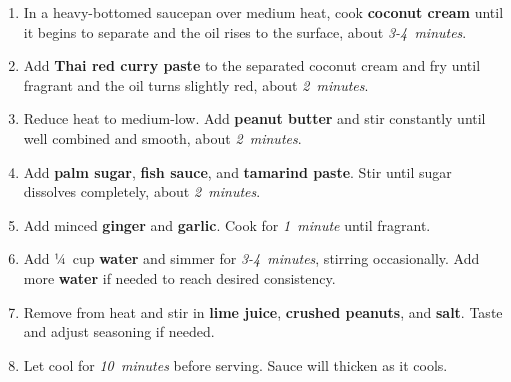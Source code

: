 \documentclass[11pt,letterpaper]{article}
\begin{document}
\begin{enumerate}
    \item In a heavy-bottomed saucepan over medium heat, cook \textbf{coconut cream} until it begins to separate and the oil rises to the surface, about \textit{3-4~minutes}.
    
    \item Add \textbf{Thai red curry paste} to the separated coconut cream and fry until fragrant and the oil turns slightly red, about \textit{2~minutes}.
    
    \item Reduce heat to medium-low. Add \textbf{peanut butter} and stir constantly until well combined and smooth, about \textit{2~minutes}.
    
    \item Add \textbf{palm sugar}, \textbf{fish sauce}, and \textbf{tamarind paste}. Stir until sugar dissolves completely, about \textit{2~minutes}.
    
    \item Add minced \textbf{ginger} and \textbf{garlic}. Cook for \textit{1~minute} until fragrant.
    
    \item Add ¼~cup \textbf{water} and simmer for \textit{3-4~minutes}, stirring occasionally. Add more \textbf{water} if needed to reach desired consistency.
    
    \item Remove from heat and stir in \textbf{lime juice}, \textbf{crushed peanuts}, and \textbf{salt}. Taste and adjust seasoning if needed.
    
    \item Let cool for \textit{10~minutes} before serving. Sauce will thicken as it cools.
\end{enumerate}

\newpage
\end{document}
